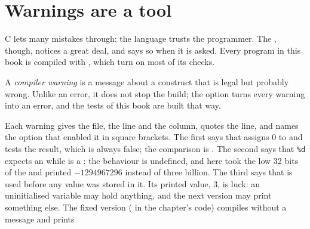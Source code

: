 \section{Warnings are a tool}\label{sec:b1:compilation-pipeline:warnings}

C lets many mistakes through: the language trusts the programmer. The , though, notices a great deal,
and says so when it is asked. Every program in this book is compiled with , which turn on
most of its checks.

\begin{definition}\label{def:b1:compilation-pipeline:warning}
A \emph{compiler warning} is a message about a construct that is legal but probably
wrong. Unlike an error, it does not stop the build; the option  turns every warning into an error,
and the tests of this book are built that way.
\end{definition}

\label{lst:b1:compilation-pipeline:warnings}

\label{out:b1:compilation-pipeline:warnings}

Each warning gives the file, the line and the column, quotes the line, and names the option that enabled it in
square brackets. The first says that  assigns 0 to  and tests the result, which is
always false; the comparison is . The second says that \texttt{\%d} expects an  while
 is a : the behaviour is undefined, and here  took the low 32 bits of the
 and printed $-1294967296$ instead of three billion. The third says that  is used before any value was stored in it. Its printed value, 3,
is luck: an uninitialised variable may hold anything, and the next  version may print something else.
The fixed version ( in the chapter's code) compiles without a message and prints


